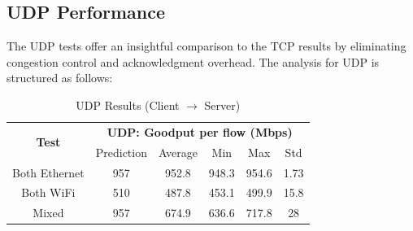     \subsection{UDP Performance} \label{subsec:udp-performance}

        The UDP tests offer an insightful comparison to the TCP results by eliminating congestion control and acknowledgment overhead. The analysis for UDP is structured as follows:

        \begin{table}[H]
            \small
            \centering
            \begin{tabular}{|ll|lllll|}
            \hline
            \multicolumn{2}{|c|}{\multirow{2}{*}{\textbf{Test}}} & 
                \multicolumn{5}{c|}{\textbf{UDP: Goodput per flow (Mbps)}} \\
            \cline{3-7}
            \multicolumn{2}{|c|}{} &
                \multicolumn{1}{c|}{Prediction} &
                \multicolumn{1}{c|}{Average} &
                \multicolumn{1}{c|}{Min} &
                \multicolumn{1}{c|}{Max} &
                \multicolumn{1}{c|}{Std} \\
            \hline
            \multicolumn{2}{|c|}{Both Ethernet} &
                \multicolumn{1}{c|}{957} &
                \multicolumn{1}{c|}{952.8} &
                \multicolumn{1}{c|}{948.3} &
                \multicolumn{1}{c|}{954.6} &
                \multicolumn{1}{c|}{1.73} \\
            \hline
            \multicolumn{2}{|c|}{Both WiFi} &
                \multicolumn{1}{c|}{510} &
                \multicolumn{1}{c|}{487.8} &
                \multicolumn{1}{c|}{453.1} &
                \multicolumn{1}{c|}{499.9} &
                \multicolumn{1}{c|}{15.8} \\
            \hline
            \multicolumn{2}{|c|}{Mixed} &
                \multicolumn{1}{c|}{957} &
                \multicolumn{1}{c|}{674.9} &
                \multicolumn{1}{c|}{636.6} &
                \multicolumn{1}{c|}{717.8} &
                \multicolumn{1}{c|}{28} \\
            \hline
            \end{tabular}
            \vspace{0.5cm}
            \caption{UDP Results (Client $\rightarrow$ Server)}
            \label{tab:udp-results}
        \end{table}



